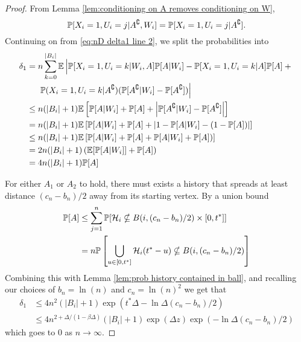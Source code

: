 \begin{proof}
		From Lemma \ref{lem:conditioning on A removes conditioning on W},
		\begin{equation}
			\mathbb{P}[X_i = 1, U_i = j | A^\complement, W_i] = \mathbb{P}[X_i = 1, U_i = j | A^\complement].
		\end{equation} 
		Continuing on from \eqref{eq:nD delta1 line 2}, we split the probabilities into
		\begin{align}
			\delta_1 &= n \sum_{k = 0}^{|B_i|} \mathbb{E} \left| \mathbb{P}[X_i = 1, U_i = k|W_i, A]\mathbb{P}[A|W_i] - \mathbb{P}[X_i = 1, U_i = k| A]\mathbb{P}[A] + \vphantom{A^\complement} \right.\\
			&\hphantom{= .} \left.\mathbb{P}(X_i = 1, U_i = k | A^\complement) (\mathbb{P}[A^\complement|W_i] - \mathbb{P}[A^\complement]) \right| \notag \\
			&\leq n (|B_i| + 1) \mathbb{E}\left[ \mathbb{P}[A|W_i] + \mathbb{P}[A] + \left|\mathbb{P}[A^\complement|W_i] - \mathbb{P}[A^\complement]\right|\right]\\
			&= n (|B_i| + 1) \mathbb{E}\left[ \mathbb{P}[A|W_i] + \mathbb{P}[A] + \left|1 - \mathbb{P}[A|W_i] - (1 - \mathbb{P}[A])\right|\right]\\
			&\leq n (|B_i| + 1) \mathbb{E}\left[ \mathbb{P}[A|W_i] + \mathbb{P}[A] + \mathbb{P}[A|W_i] + \mathbb{P}[A])\right]\\
			&= 2 n (|B_i| + 1) \left(\mathbb{E}[\mathbb{P}[A|W_i]] + \mathbb{P}[A]\right)\\
			&= 4 n (|B_i| + 1) \mathbb{P}[A]
		\end{align}

		For either $A_1$ or $A_2$ to hold, there must exists a history that spreads at least distance $(c_n - b_n) / 2$ away from its starting vertex. 
		By a union bound
		\begin{align}
			\mathbb{P}[A] &\leq \sum_{j = 1}^n \mathbb{P}[\mathcal{H}_i \nsubseteq B(i, (c_n - b_n)/2) \times [0, t^*]]\\
				&= n \mathbb{P}\left[\bigcup_{u \in [0, t^*]}\mathcal{H}_i(t^* - u) \nsubseteq B(i, (c_n - b_n)/2)\right]
		\end{align}
		Combining this with Lemma \ref{lem:prob history contained in ball}, and recalling our choices of $b_n = \ln(n)$ and $c_n = \ln(n)^2$ we get that
		\begin{align}
			\delta_1 &\leq 4 n^2 (|B_i| + 1) \exp(t^* \Delta - \ln\Delta(c_n - b_n)/2)\\
			&\leq 4n^{2 + \Delta/(1 - \beta \Delta)}(|B_i| + 1)\exp(\Delta z) \exp(-\ln \Delta (c_n - b_n)/2)
		\end{align}
		which goes to $0$ as $n \rightarrow \infty$.



\end{proof}
